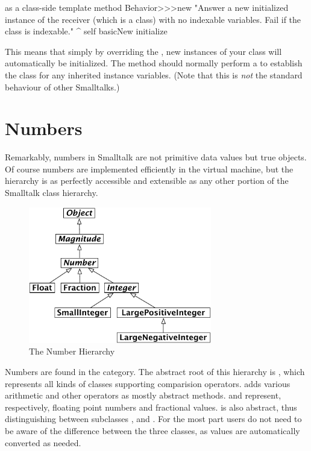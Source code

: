 \documentclass[a4paper,10pt,twoside]{book}
\begin{document}
\begin{method}{ as a class-side template method}
Behavior>>>new
    "Answer a new initialized instance of the receiver (which is a class) with no indexable
    variables. Fail if the class is indexable."
    ^ self basicNew initialize
\end{method}

This means that simply by overriding the  , new instances of your class will automatically be initialized. The  method should normally perform a  to establish the class  for any inherited instance variables.
(Note that this is \emph{not} the standard behaviour of other Smalltalks.)

\section{Numbers}
\label{sec:Number}
Remarkably, numbers in Smalltalk are not primitive data values but true objects. Of course numbers are implemented efficiently in the virtual machine, but the  hierarchy is as perfectly accessible and extensible as any other portion of the Smalltalk class hierarchy.

\begin{figure}[ht]
\centerline {\includegraphics[width=8cm]{NumberHierarchy}}
\caption{The Number Hierarchy \label{fig:numbers}}
\end{figure}

Numbers are found in the  category. The abstract root of this hierarchy is , which represents all kinds of classes supporting comparision operators.  adds various arithmetic and other operators as mostly abstract methods.  and  represent, respectively, floating point numbers and fractional values.   is also abstract, thus distinguishing between subclasses ,  and . For the most part users do not need to be aware of the difference between the three  classes, as values are automatically converted as needed.
\end{document}
